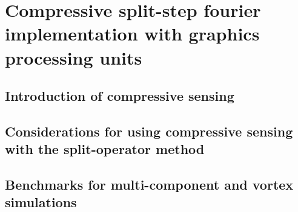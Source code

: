 
\chapter{Compressive split-step fourier implementation with graphics processing units} \label{ch-cssfm}

\section{Introduction of compressive sensing}

\section{Considerations for using compressive sensing with the split-operator method}

\section{Benchmarks for multi-component and vortex simulations}
